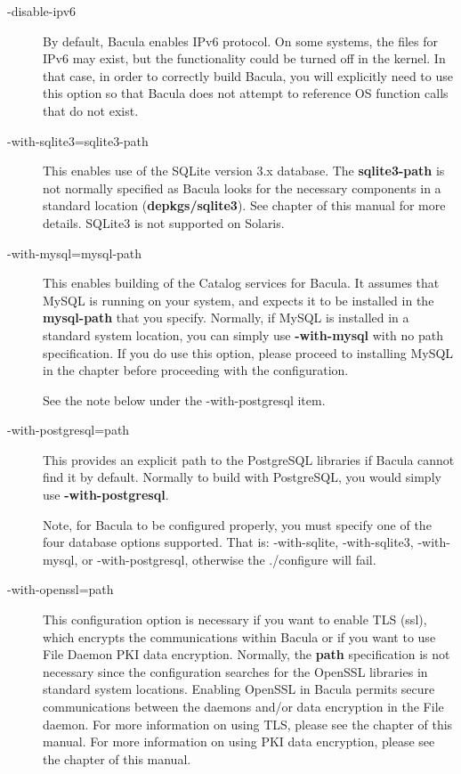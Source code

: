 \begin{description}
\item [ {-}{\-}disable-ipv6 ]
   By default, Bacula enables IPv6 protocol. On some systems, the files
   for IPv6 may exist, but the functionality could be turned off in the
   kernel. In that case, in order to correctly build Bacula, you will
   explicitly need to use this option so that Bacula does not attempt
   to reference OS function calls that do not exist.

\item [ {-}{\-}with-sqlite3=\lt{}sqlite3-path\gt{}]
   This enables use of the SQLite version 3.x database.  The {\bf
   sqlite3-path} is not normally specified as Bacula looks for the
   necessary components in a standard location ({\bf depkgs/sqlite3}).  See
    chapter of
   this manual for more details. SQLite3 is not supported on Solaris.

\item [ {-}{\-}with-mysql=\lt{}mysql-path\gt{}]
   This enables building of the Catalog services for Bacula.  It assumes
   that MySQL is running on your system, and expects it to be installed in
   the {\bf mysql-path} that you specify.  Normally, if MySQL is installed
   in a standard system location, you can simply use {\bf {-}{\-}with-mysql}
   with no path specification.  If you do use this option, please proceed
   to installing MySQL in the  chapter before proceeding with the configuration.

   See the note below under the {-}{\-}with-postgresql item.

\item [ {-}{\-}with-postgresql=\lt{}path\gt{}]
   This provides an explicit path to the PostgreSQL libraries if Bacula
   cannot find it by default.  Normally to build with PostgreSQL, you would
   simply use {\bf {-}{\-}with-postgresql}.

   Note, for Bacula to be configured properly, you must specify one
   of the four database options supported.  That is:
   {-}{\-}with-sqlite, {-}{\-}with-sqlite3, {-}{\-}with-mysql, or
   {-}{\-}with-postgresql, otherwise the ./configure will fail.

\item [ {-}{\-}with-openssl=\lt{}path\gt{}]
   This configuration option is necessary if you want to enable TLS (ssl),
   which encrypts the communications within       
   Bacula or if you want to use File Daemon PKI data encryption.
   Normally, the {\bf path} specification is not necessary since
   the configuration searches for the OpenSSL libraries in standard system
   locations. Enabling OpenSSL in Bacula permits secure communications
   between the daemons and/or data encryption in the File daemon.
   For more information on using TLS, please see the
    chapter
   of this manual.
   For more information on using PKI data encryption, please see the
   chapter of this manual.


\end{description}

